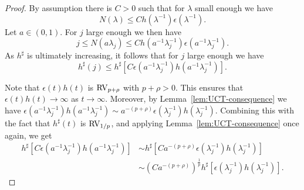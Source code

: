 \documentclass[10pt, a4paper]{amsart}
\numberwithin{equation}{section}
\theoremstyle{definition}
\theoremstyle{remark}
\newcommand{\RV}{\textup{RV}}
\begin{document}
\begin{proof}
 By assumption there is $C>0$ such that for $\lambda$ small enough we have
 \begin{equation}\label{eq:case c=0}
 N(\lambda)\leq Ch(\lambda^{-1})\epsilon(\lambda^{-1}).
 \end{equation}
Let $a\in(0,1)$. For $j$ large enough we then have
\begin{equation*}
j\leq N(a\lambda_j)\leq Ch(a^{-1}\lambda_j^{-1})\epsilon(a^{-1}\lambda_j^{-1}).
\end{equation*}
As $h^\sharp$ is ultimately increasing, it follows that for $j$ large enough we have
\begin{equation}\label{eq:appendix.hsharpj-ineq}
h^\sharp(j)\leq h^\sharp\left[ C\epsilon(a^{-1}\lambda_j^{-1})h(a^{-1}\lambda_j^{-1})\right].
\end{equation}

Note that $\epsilon(t)h(t)$ is $\RV_{p+\rho}$ with $p+\rho>0$. This ensures that $\epsilon(t)h(t)\rightarrow \infty$ as $t\rightarrow \infty$. Moreover, by 
Lemma~\ref{lem:UCT-consequence} we have $\epsilon(a^{-1}\lambda_j^{-1})h(a^{-1}\lambda_j^{-1})\sim a^{-(p+\rho)}\epsilon(\lambda_j^{-1})h(\lambda_j^{-1})$. Combining this with the fact that $h^\sharp(t)$ is $\RV_{1/p}$, and applying Lemma~\ref{lem:UCT-consequence} once again, we get
\begin{align}
 h^\sharp\left[ C\epsilon(a^{-1}\lambda_j^{-1}) h(a^{-1}\lambda_j^{-1}) \right] &\sim  h^\sharp\left[ Ca^{-(p+\rho)}\epsilon(\lambda_j^{-1})h(\lambda_j^{-1})\right] \nonumber\\
 & \sim 
\left(Ca^{-(p+\rho)}\right)^{\frac{1}{p}} h^\sharp\left[ \epsilon(\lambda_j^{-1})h(\lambda_j^{-1})\right].
\label{eq:appendix.hsharpj-ineq2} 
\end{align}


\end{proof}
\end{document}
